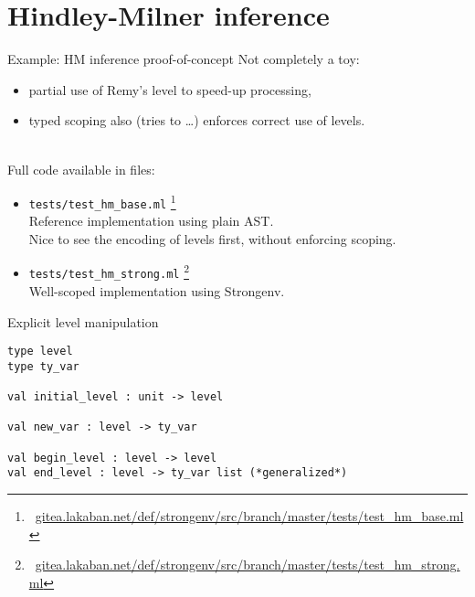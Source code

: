 \documentclass{beamer}          %
\begin{document}
\section{Hindley-Milner inference}

\begin{frame}{Example: HM inference proof-of-concept}
  Not completely a toy:
  \begin{itemize}
    \item partial use of Remy's level to speed-up processing,
    \item typed scoping also (tries to \ldots) enforces correct use of levels.
  \end{itemize}

  ~\\

  \pause
  Full code available in files:
  \begin{itemize}
    \item {\tt tests/test\_hm\_base.ml}
          \footnote{~\href{https://gitea.lakaban.net/def/strongenv/src/branch/master/tests/test_hm_base.ml}{gitea.lakaban.net/def/strongenv/src/branch/master/tests/test\_hm\_base.ml}} \\
          Reference implementation using plain AST. \\
          Nice to see the encoding of levels first, without enforcing scoping.

     \pause
    \item {\tt tests/test\_hm\_strong.ml}
\footnote{~\href{https://gitea.lakaban.net/def/strongenv/src/branch/master/tests/test_hm_strong.ml}{gitea.lakaban.net/def/strongenv/src/branch/master/tests/test\_hm\_strong.ml}} \\
          Well-scoped implementation using Strongenv.
  \end{itemize}

\end{frame}

\begin{frame}[fragile]{Explicit level manipulation}

\begin{lstlisting}
type level
type ty_var

val initial_level : unit -> level

val new_var : level -> ty_var

val begin_level : level -> level
val end_level : level -> ty_var list (*generalized*)
\end{lstlisting}

\end{frame}
\end{document}
